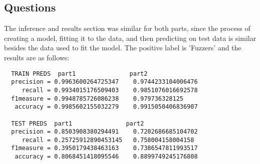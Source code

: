 \documentclass[11pt]{article}
\begin{document}
\subsection*{Questions}
The inference and results section was similar for both parts, since the process of creating a model, fitting it to the data, and then predicting on test data is
similar besides the data used to fit the model. The positive label is 'Fuzzers' and the results are as follows:
\begin{verbatim}
  TRAIN PREDS  part1               part2
  precision = 0.9963600264725347	0.9744233104006476
     recall = 0.9934015176509403	0.9851076016692578
  f1measure = 0.9948785726086238	0.979736328125
   accuracy = 0.9985602155032279	0.9915050406836907

  TEST PREDS  part1               part2
  precision = 0.8503908380294491	0.7202686685104702
     recall = 0.25725912890453145	0.758004158004158
  f1measure = 0.3950179438463163	0.7386547811993517
   accuracy = 0.8068451418095546	0.8899749245176808
\end{verbatim}
\end{document}
